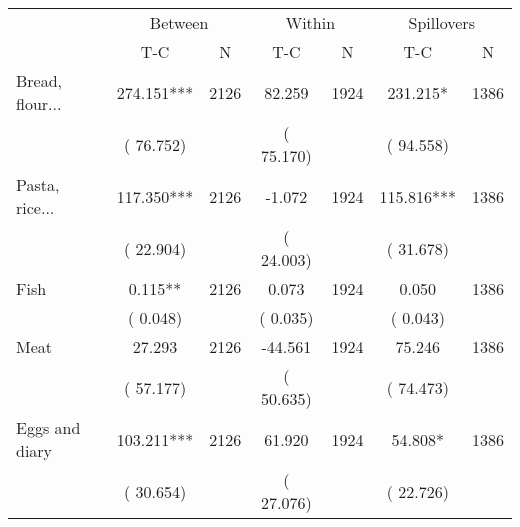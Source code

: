 
\begin{tabular}{l*{6}{c}}\hline&\multicolumn{2}{c}{Between}&\multicolumn{2}{c}{Within}&\multicolumn{2}{c}{Spillovers} \\ \cmidrule(r){2-3}\cmidrule(l){4-5}\cmidrule(l){6-7} & {T-C} & {N} & {T-C} & {N}  & {T-C}  & {N}  \\ \midrule
Bread, flour...        &            274.151***      &       2126       &             82.259      &       1924       &            231.215*      &       1386       \\
                       &       (      76.752)            &                               &       (      75.170)            &                               &       (      94.558)            &                               \\
Pasta, rice...        &            117.350***      &       2126       &             -1.072      &       1924       &            115.816***      &       1386       \\
                       &       (      22.904)            &                               &       (      24.003)            &                               &       (      31.678)            &                               \\
Fish        &              0.115**      &       2126       &              0.073      &       1924       &              0.050      &       1386       \\
                       &       (       0.048)            &                               &       (       0.035)            &                               &       (       0.043)            &                               \\
Meat        &             27.293      &       2126       &            -44.561      &       1924       &             75.246      &       1386       \\
                       &       (      57.177)            &                               &       (      50.635)            &                               &       (      74.473)            &                               \\
Eggs and diary        &            103.211***      &       2126       &             61.920      &       1924       &             54.808*      &       1386       \\
                       &       (      30.654)            &                               &       (      27.076)            &                               &       (      22.726)            &                               \\

\end{tabular}
